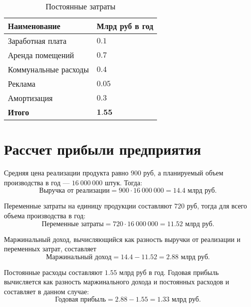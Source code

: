 \vspace{-2cm}
\begin{center}
\captionsetup{format=hang,justification=raggedright,
              singlelinecheck=off,width=13.5cm}
    \begin{longtable}[c]{|P{6cm}|P{7cm}|}
    \caption{Постоянные затраты\label{tbl:const}}
    \\ \hline
        \textbf{Наименование} & \textbf{Млрд руб в год}
    \\ \hline
        Заработная плата & $0.1$
    \\ \hline
        Аренда помещений & $0.7$
    \\ \hline
        Коммунальные расходы & $0.4$
    \\ \hline
        Реклама & $0.05$
    \\ \hline
        Амортизация & $0.3$
    \\ \hline
        \textbf{Итого} & $\textbf{1.55}$
    \\ \hline
\end{longtable}
\end{center}

\clearpage
\section{Рассчет прибыли предприятия}

Средняя цена реализации продукта равно $900$ руб, а планируемый объем
производства в год --- $16\ 000\ 000$ штук. Тогда:
\begin{equation}
    \textbf{Выручка от реализации} = 900 \cdot 16\ 000\ 000 = 14.4 \text{ млрд
    руб.}
\end{equation}

Переменные затраты на единицу продукции составляют $720$ руб, тогда для
всего объема производства в год:
\begin{equation}
    \textbf{Переменные затраты} = 720 \cdot 16\ 000\ 000 = 11.52 \text{ млрд руб.}
\end{equation}

Маржинальный доход, вычисляющийся как разность выручки от
реализации и переменных затрат, составляет
\begin{equation}
    \textbf{Маржинальный доход} = 14.4 - 11.52 = 2.88 \text{ млрд руб.}
\end{equation}

Постоянные расходы составляют $1.55$ млрд руб в год. Годовая прибыль
вычисляется как разность маржинального дохода и постоянных расходов и составляет
в данном случае:
\begin{equation}
    \textbf{Годовая прибыль} = 2.88 - 1.55 = 1.33 \text{ млрд руб.}
\end{equation}


